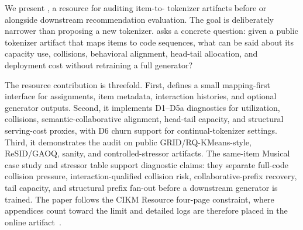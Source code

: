 We present \tool, a resource for auditing item-to-\sid{} tokenizer artifacts
before or alongside downstream recommendation evaluation. The goal is
deliberately narrower than proposing a new tokenizer. \tool asks a concrete
question: given a public tokenizer artifact that maps items to code sequences,
what can be said about its capacity use, collisions, behavioral alignment,
head-tail allocation, and deployment cost without retraining a full generator?

The resource contribution is threefold. First, \tool defines a small
mapping-first interface for \sid assignments, item metadata, interaction
histories, and optional generator outputs. Second, it implements D1--D5a
diagnostics for utilization, collisions, semantic-collaborative alignment,
head-tail capacity, and structural serving-cost proxies, with D6 churn support
for continual-tokenizer settings. Third, it demonstrates the audit on public
GRID/RQ-KMeans-style, ReSID/GAOQ, sanity, and controlled-stressor artifacts.
The same-item Musical case study and stressor table support diagnostic claims:
they separate full-code collision pressure, interaction-qualified collision
risk, collaborative-prefix recovery, tail capacity, and structural prefix
fan-out before a downstream generator is trained. The paper follows the CIKM
Resource four-page constraint, where appendices count toward the limit and
detailed logs are therefore placed in the online artifact~\cite{cikm2026resource}.
